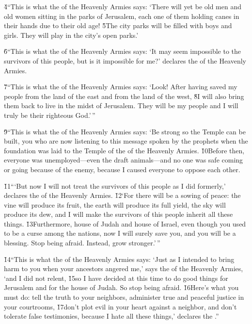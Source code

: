 \v{4}``This is what the  of the Heavenly Armies says: `There will yet be old men and old women sitting in the parks of Jerusalem, each one of them holding canes in their hands due to their old age! \v{5}The city parks will be filled with boys and girls. They will play in the city's open parks.'

\v{6}``This is what the  of the Heavenly Armies says: `It may seem impossible to the survivors of this people, but is it impossible for me?' declares the  of the Heavenly Armies.

\v{7}``This is what the  of the Heavenly Armies says: `Look! After having saved my people from the land of the east and from the land of the west, \v{8}I will also bring them back to live in the midst of Jerusalem. They will be my people and I will truly be their righteous God.'\,''

\v{9}``This is what the  of the Heavenly Armies says: `Be strong so the Temple can be built, you who are now listening to this message spoken by the prophets when the foundation was laid to the Temple of the  of the Heavenly Armies. \v{10}Before then, everyone was unemployed---even the draft animals---and no one was safe coming or going because of the enemy, because I caused everyone to oppose each other.

\v{11}```But now I will not treat the survivors of this people as I did formerly,' declares the  of the Heavenly Armies. \v{12}`For there will be a sowing of peace: the vine will produce its fruit, the earth will produce its full yield, the sky will produce its dew, and I will make the survivors of this people inherit all these things. \v{13}Furthermore, house of Judah and house of Israel, even though you used to be a curse among the nations, now I will surely save you, and you will be a blessing. Stop being afraid. Instead, grow stronger.'\,''

\v{14}``This is what the  of the Heavenly Armies says: `Just as I intended to bring harm to you when your ancestors angered me,' says the  of the Heavenly Armies, `and I did not relent, \v{15}so I have decided at this time to do good things for Jerusalem and for the house of Judah. So stop being afraid. \v{16}Here's what you must do: tell the truth to your neighbors, administer true and peaceful justice in your courtrooms, \v{17}don't plot evil in your heart against a neighbor, and don't tolerate false testimonies, because I hate all these things,' declares the .''

